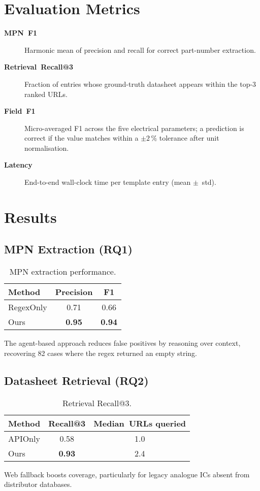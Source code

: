 \section{Evaluation Metrics}
\begin{description}
  \item[\textbf{MPN~F1}] Harmonic mean of precision and recall for correct part-number extraction.
  \item[\textbf{Retrieval~Recall@3}] Fraction of entries whose ground-truth datasheet appears within the top-3 ranked URLs.
  \item[\textbf{Field~F1}] Micro-averaged F1 across the five electrical parameters; a prediction is correct if the value matches within a $\pm2\,\%$ tolerance after unit normalisation.
  \item[\textbf{Latency}] End-to-end wall-clock time per template entry (mean $\pm$~std).
\end{description}

\section{Results}
\subsection{MPN Extraction (RQ1)}
\begin{table}[H]
\centering
\caption{MPN extraction performance.}
\label{tab:mpn}
\begin{tabular}{lcc}
\toprule
Method & Precision & F1 \\
\midrule
RegexOnly & 0.71 & 0.66 \\
Ours      & \textbf{0.95} & \textbf{0.94} \\
\bottomrule
\end{tabular}
\end{table}
The agent-based approach reduces false positives by reasoning over context, recovering 82 cases where the regex returned an empty string.

\subsection{Datasheet Retrieval (RQ2)}
\begin{table}[H]
\centering
\caption{Retrieval Recall@3.}
\label{tab:retrieval}
\begin{tabular}{lcc}
\toprule
Method & Recall@3 & Median~URLs queried \\
\midrule
APIOnly & 0.58 & 1.0 \\
Ours    & \textbf{0.93} & 2.4 \\
\bottomrule
\end{tabular}
\end{table}
Web fallback boosts coverage, particularly for legacy analogue ICs absent from distributor databases.

